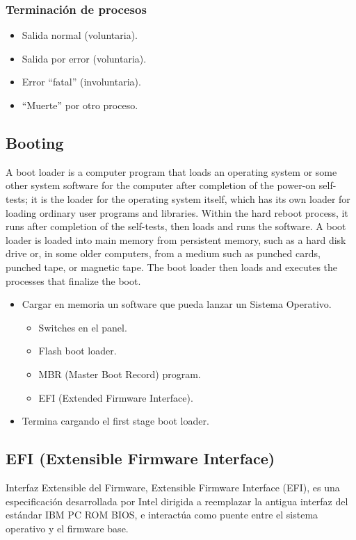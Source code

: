 \documentclass[a4paper, twoside]{article}
\begin{document}
\subsubsection{Terminación de procesos}
\begin{itemize}
	\item Salida normal (voluntaria).
	\item Salida por error (voluntaria).
	\item Error “fatal” (involuntaria).
	\item “Muerte” por otro proceso.
\end{itemize}

\subsection{Booting}
A boot loader is a computer program that loads an operating system or some other system software for the computer after completion of the power-on self-tests; it is the loader for the operating system itself, which has its own loader for loading ordinary user programs and libraries. Within the hard reboot process, it runs after completion of the self-tests, then loads and runs the software. A boot loader is loaded into main memory from persistent memory, such as a hard disk drive or, in some older computers, from a medium such as punched cards, punched tape, or magnetic tape. The boot loader then loads and executes the processes that finalize the boot.

\begin{itemize}
	\item Cargar en memoria un software que pueda lanzar un Sistema Operativo.
	\begin{itemize}
		\item Switches en el panel.
		\item Flash boot loader.
		\item MBR (Master Boot Record) program.
		\item EFI (Extended Firmware Interface).
	\end{itemize}
	\item Termina cargando el first stage boot loader.
\end{itemize}

\subsection{EFI (Extensible Firmware Interface)}
Interfaz Extensible del Firmware, Extensible Firmware Interface (EFI), es una especificación desarrollada por Intel dirigida a reemplazar la antigua interfaz del estándar IBM PC ROM BIOS, e interactúa como puente entre el sistema operativo y el firmware base.
\end{document}
